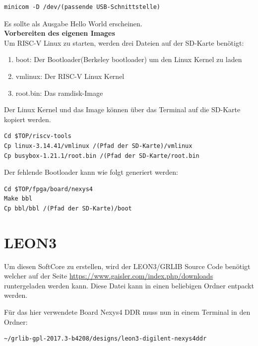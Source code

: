 \begin{lstlisting}[caption={Aufruf des \emph{Minicom}},label={code:minicom}]
minicom -D /dev/(passende USB-Schnittstelle)
\end{lstlisting}


Es sollte als Ausgabe Hello World erscheinen.\\

\textbf{Vorbereiten des eigenen Images}\\

Um RISC-V Linux zu starten, werden drei Dateien auf der SD-Karte benötigt:
\begin{enumerate}
  \item boot: Der Bootloader(Berkeley bootloader) um den Linux Kernel zu laden
  \item vmlinux: Der RISC-V Linux Kernel
  \item root.bin: Das ramdisk-Image
\end{enumerate}

\vspace{5mm}
Der Linux Kernel und das Image können über das Terminal auf die SD-Karte kopiert werden.

\begin{lstlisting}
Cd $TOP/riscv-tools
Cp linux-3.14.41/vmlinux /(Pfad der SD-Karte)/vmlinux
Cp busybox-1.21.1/root.bin /(Pfad der SD-Karte/root.bin
\end{lstlisting}


Der fehlende Bootloader kann wie folgt generiert werden:\\

\begin{lstlisting}
Cd $TOP/fpga/board/nexys4
Make bbl
Cp bbl/bbl /(Pfad der SD-Karte)/boot
\end{lstlisting}

\newpage

\section{LEON3}\label{kap:leon3}

Um diesen SoftCore zu erstellen, wird der LEON3/GRLIB Source Code benötigt welcher auf der Seite
\url{https://www.gaisler.com/index.php/downloads} runtergeladen werden kann.
Diese Datei kann in einen beliebigen Ordner entpackt werden.

Für das hier verwendete Board Nexys4 DDR muss nun in einem Terminal in den Ordner:\\

\begin{lstlisting}[caption={Pfad zu dem passenden Design},label={code:pfaddesign}]
  ~/grlib-gpl-2017.3-b4208/designs/leon3-digilent-nexys4ddr
   \end{lstlisting}

